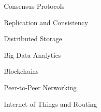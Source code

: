 \documentclass[aspectratio=1610,17pt,utf8]{beamer}
\begin{document}
\begin{frame}{Consensus Protocols}
\end{frame}


\begin{frame}{Replication and Consistency}
\end{frame}


\begin{frame}{Distributed Storage}
\end{frame}


\begin{frame}{Big Data Analytics}
\end{frame}


\begin{frame}{Blockchains}
\end{frame}


\begin{frame}{Peer-to-Peer Networking}
\end{frame}


\begin{frame}{Internet of Things and Routing}
\end{frame}
\end{document}
